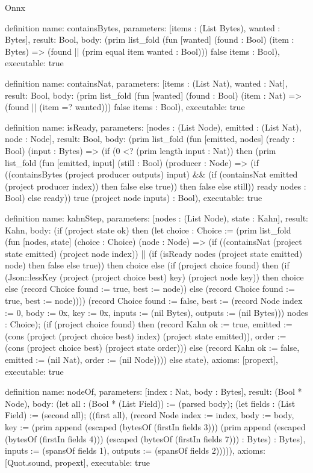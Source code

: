 \begin{lexlean}{Onnx}
\begin{semanticmodule}
definition{
  name: containsBytes,
  parameters: [items : (List Bytes), wanted : Bytes],
  result: Bool,
  body: (prim list_fold (fun [wanted] (found : Bool) (item : Bytes) => (found || (prim equal item wanted : Bool))) false items : Bool),
  executable: true
}

definition{
  name: containsNat,
  parameters: [items : (List Nat), wanted : Nat],
  result: Bool,
  body: (prim list_fold (fun [wanted] (found : Bool) (item : Nat) => (found || (item =? wanted))) false items : Bool),
  executable: true
}

definition{
  name: isReady,
  parameters: [nodes : (List Node), emitted : (List Nat), node : Node],
  result: Bool,
  body: (prim list_fold (fun [emitted, nodes] (ready : Bool) (input : Bytes) => (if (0 <? (prim length input : Nat)) then (prim list_fold (fun [emitted, input] (still : Bool) (producer : Node) => (if ((containsBytes (project producer outputs) input) && (if (containsNat emitted (project producer index)) then false else true)) then false else still)) ready nodes : Bool) else ready)) true (project node inputs) : Bool),
  executable: true
}

definition{
  name: kahnStep,
  parameters: [nodes : (List Node), state : Kahn],
  result: Kahn,
  body: (if (project state ok) then (let choice : Choice := (prim list_fold (fun [nodes, state] (choice : Choice) (node : Node) => (if ((containsNat (project state emitted) (project node index)) || (if (isReady nodes (project state emitted) node) then false else true)) then choice else (if (project choice found) then (if (Json::lessKey (project (project choice best) key) (project node key)) then choice else (record Choice {found := true, best := node})) else (record Choice {found := true, best := node})))) (record Choice {found := false, best := (record Node {index := 0, body := 0x, key := 0x, inputs := (nil Bytes), outputs := (nil Bytes)})}) nodes : Choice); (if (project choice found) then (record Kahn {ok := true, emitted := (cons (project (project choice best) index) (project state emitted)), order := (cons (project choice best) (project state order))}) else (record Kahn {ok := false, emitted := (nil Nat), order := (nil Node)}))) else state),
  axioms: [propext],
  executable: true
}

definition{
  name: nodeOf,
  parameters: [index : Nat, body : Bytes],
  result: (Bool * Node),
  body: (let all : (Bool * (List Field)) := (parsed body); (let fields : (List Field) := (second all); ((first all), (record Node {index := index, body := body, key := (prim append (escaped (bytesOf (firstIn fields 3))) (prim append (escaped (bytesOf (firstIn fields 4))) (escaped (bytesOf (firstIn fields 7))) : Bytes) : Bytes), inputs := (spansOf fields 1), outputs := (spansOf fields 2)})))),
  axioms: [Quot.sound, propext],
  executable: true
}


\end{semanticmodule}
\end{lexlean}
